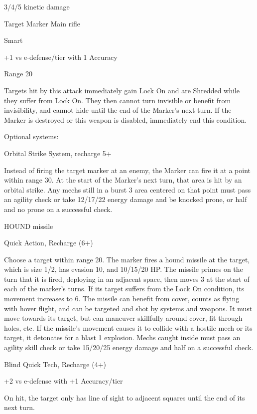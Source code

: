 3/4/5 kinetic damage
 

Target Marker  
Main rifle
 
Smart
 
+1 vs e-defense/tier with 1 Accuracy
 
Range 20
 
Targets hit by this attack immediately gain Lock On and are Shredded while they suffer from  
Lock On. They then cannot turn invisible or benefit from invisibility, and cannot hide until the end  
of the Marker’s next turn. If the Marker is destroyed or this weapon is disabled, immediately end  
this condition.
 

Optional systems:  

                                                                                                          


Orbital Strike  
System, recharge 5+
 
Instead of firing the target marker at an enemy, the Marker can fire it at a point within range 30.  
At the start of the Marker’s next turn, that area is hit by an orbital strike. Any mechs still in a burst  
3 area centered on that point must pass an agility check or take 12/17/22 energy damage and be  
knocked prone, or half and no prone on a successful check.
 

HOUND missile
 
Quick Action, Recharge (6+)
 
Choose a target within range 20. The marker fires a hound missile at the target, which is size 1/2,  
has evasion 10, and 10/15/20 HP. The missile primes on the turn that it is fired, deploying in an  
adjacent space, then moves 3 at the start of each of the marker’s turns. If its target suffers from  
the Lock On condition, its movement increases to 6. The missile can benefit from cover, counts  
as flying with hover flight, and can be targeted and shot by systems and weapons. It must move  
towards its target, but can maneuver skillfully around cover, fit through holes, etc. If the missile’s  
movement causes it to collide with a hostile mech or its target, it detonates for a blast 1  
explosion. Mechs caught inside must pass an agility skill check or take 15/20/25 energy damage  
and half on a successful check.
 

Blind  
Quick Tech, Recharge (4+)
 
+2 vs e-defense with +1 Accuracy/tier
 
On hit, the target only has line of sight to adjacent squares until the end of its next turn.
 

